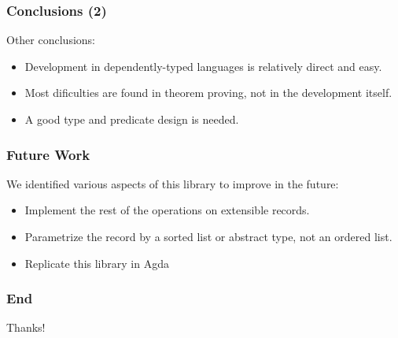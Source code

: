 \documentclass{beamer}
\begin{document}
\begin{frame}
\frametitle{Conclusions (2)}

Other conclusions:

\begin{itemize}
\item Development in dependently-typed languages is relatively direct and easy.
\item Most dificulties are found in theorem proving, not in the development itself.
\item A good type and predicate design is needed.
\end{itemize}

\end{frame}

\begin{frame}
\frametitle{Future Work}

We identified various aspects of this library to improve in the future:

\begin{itemize}
\item Implement the rest of the operations on extensible records.
\item Parametrize the record by a sorted list or abstract type, not an ordered list.
\item Replicate this library in Agda
\end{itemize}

\end{frame}

\begin{frame}
\frametitle{End}

\begin{center}
{\huge Thanks!}
\end{center}

\end{frame}
\end{document}
